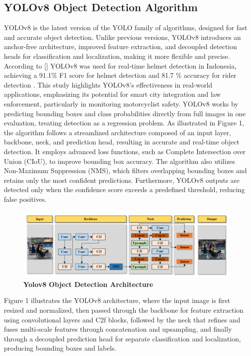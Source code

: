 \begin{refsection}
\section*{ YOLOv8 Object Detection Algorithm}

YOLOv8 is the latest version of the YOLO family of algorithms, designed for fast and accurate object detection. Unlike previous versions, YOLOv8 introduces an anchor-free architecture, improved feature extraction, and decoupled detection heads for classification and localization, making it more flexible and precise. According to \citeauthor{Muhammad2024} [\citeyear{Muhammad2024}] YOLOv8 was used for real-time helmet detection in Indonesia, achieving a 91.1\% F1 score for helmet detection and 81.7 \% accuracy for rider detection \cite{Muhammad2024}. This study highlights YOLOv8's effectiveness in real-world applications, emphasizing its potential for smart city integration and law enforcement, particularly in monitoring motorcyclist safety.
YOLOv8 works by predicting bounding boxes and class probabilities directly from full images in one evaluation, treating detection as a regression problem. As illustrated in Figure 1, the algorithm follows a streamlined architecture composed of an input layer, backbone, neck, and prediction head, resulting in accurate and real-time object detection. It employs advanced loss functions, such as Complete Intersection over Union (CIoU), to improve bounding box accuracy. The algorithm also utilizes Non-Maximum Suppression (NMS), which filters overlapping bounding boxes and retains only the most confident predictions. Furthermore, YOLOv8 outputs are detected only when the confidence score exceeds a predefined threshold, reducing false positives. 

\begin{figure}[H]
    \centering
    \includegraphics[width=1\textwidth]{figures/Fig 1.png} %
    \caption{\textbf{Yolov8 Object Detection Architecture}}
    \label{fig:yolov8_architecture}
\end{figure}


Figure 1 illustrates the YOLOv8 architecture, where the input image is first resized  and normalized, then passed through the backbone for feature extraction using convolutional layers  and C2f blocks, followed by the neck that refines and fuses multi-scale features through concatenation  and upsampling, and finally through a decoupled prediction head for separate classification and  localization, producing bounding boxes and labels.



\end{refsection}
